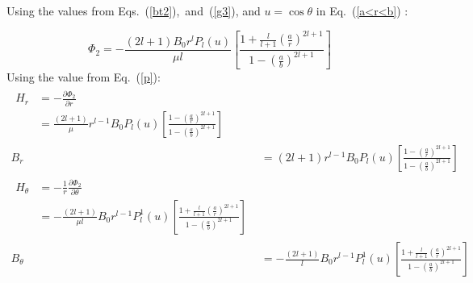 Using the values from Eqs.~(\ref{bt2}),~and~(\ref{g3}), and $u=\cos\theta$ in Eq.~(\ref{a<r<b}) :



\begin{equation}\label{p}
\Phi_2=-\frac{(2l+1)B_0r^lP_l(u)}{\mu l}\left[\frac{1+\frac{l}{l+1}\left(\frac{a}{r}\right)^{2l+1}}{1-\left(\frac{a}{b}\right)^{2l+1}}\right]
\end{equation}
Using the value from Eq.~(\ref{p}):
\begin{align}
    \begin{split}\label{Hr}
        H_r &=-\frac{\partial \Phi_2}{\partial r}\\
        &=\frac{(2l+1)}{\mu}r^{l-1}B_0P_l(u)\left[\frac{1-\left(\frac{a}{r}\right)^{2l+1}}{1-\left(\frac{a}{b}\right)^{2l+1}}\right]
    \end{split}\\
    B_r &=(2l+1)r^{l-1}B_0P_l(u)\left[\frac{1-\left(\frac{a}{r}\right)^{2l+1}}{1-\left(\frac{a}{b}\right)^{2l+1}}\right]\label{Br}\\
    \begin{split}\label{Ht}
        H_\theta &=-\frac{1}{r}\frac{\partial \Phi_2}{\partial \theta}\\
         & =-\frac{(2l+1)}{\mu l}B_0r^{l-1}P_l^1(u)\left[
         \frac{1+\frac{l}{l+1}\left(\frac{a}{r}\right)^{2l+1}}
         {1-\left(\frac{a}{b}\right)^{2l+1}}
         \right]
    \end{split}\\
    B_\theta &=-\frac{(2l+1)}{l}B_0r^{l-1}P_l^1(u)\left[\frac{1+\frac{l}{l+1}\left(\frac{a}{r}\right)^{2l+1}}{1-\left(\frac{a}{b}\right)^{2l+1}}\right]\label{Bt}
\end{align}

